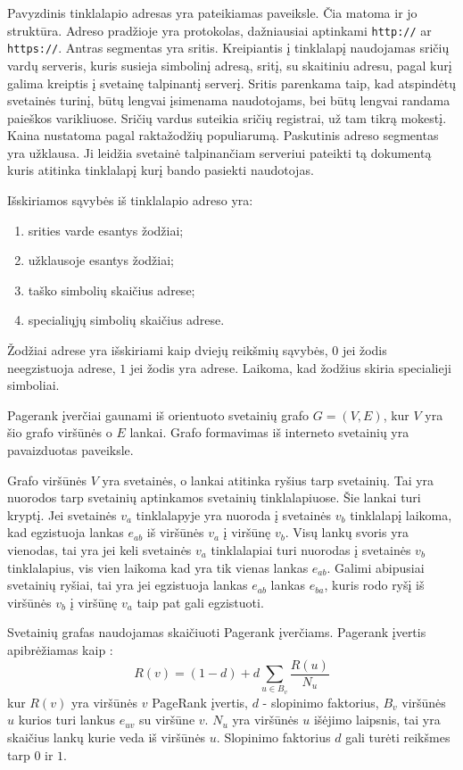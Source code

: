 Pavyzdinis tinklalapio adresas yra pateikiamas  paveiksle. Čia matoma ir jo struktūra. Adreso pradžioje yra protokolas, dažniausiai aptinkami \texttt{http://} ar \texttt{https://}. Antras segmentas yra sritis. Kreipiantis į tinklalapį naudojamas sričių vardų serveris, kuris susieja simbolinį adresą, sritį, su skaitiniu adresu, pagal kurį galima kreiptis į svetainę talpinantį serverį. Sritis parenkama taip, kad atspindėtų svetainės turinį, būtų lengvai įsimenama naudotojams, bei būtų lengvai randama paieškos varikliuose. Sričių vardus suteikia sričių registrai, už tam tikrą mokestį. Kaina nustatoma pagal raktažodžių populiarumą. Paskutinis adreso segmentas yra užklausa. Ji leidžia svetainė talpinančiam serveriui pateikti tą dokumentą kuris atitinka tinklalapį kurį bando pasiekti naudotojas.

Išskiriamos sąvybės iš tinklalapio adreso yra:
\begin{enumerate}
\item srities varde esantys žodžiai;
\item užklausoje esantys žodžiai;
\item taško simbolių skaičius adrese;
\item specialiųjų simbolių skaičius adrese.
\end{enumerate}
Žodžiai adrese yra išskiriami kaip dviejų reikšmių sąvybės, $0$ jei žodis neegzistuoja adrese, $1$ jei žodis yra adrese. Laikoma, kad žodžius skiria specialieji simboliai.

Pagerank įverčiai gaunami iš orientuoto svetainių grafo $G = (V, E)$, kur $V$ yra šio grafo viršūnės o $E$ lankai. Grafo formavimas iš interneto svetainių yra pavaizduotas  paveiksle.

Grafo viršūnės $V$ yra svetainės, o lankai atitinka ryšius tarp svetainių. Tai yra nuorodos tarp svetainių aptinkamos svetainių tinklalapiuose. Šie lankai turi kryptį. Jei svetainės $v_a$ tinklalapyje yra nuoroda į svetainės $v_b$ tinklalapį laikoma, kad egzistuoja lankas $e_{ab}$ iš viršūnės $v_a$ į viršūnę $v_b$. Visų lankų svoris yra vienodas, tai yra jei keli svetainės $v_a$ tinklalapiai turi nuorodas į svetainės $v_b$ tinklalapius, vis vien laikoma kad yra tik vienas lankas $e_{ab}$. Galimi abipusiai svetainių ryšiai, tai yra jei egzistuoja lankas $e_{ab}$ lankas $e_{ba}$, kuris rodo ryšį iš viršūnės $v_b$ į viršūnę $v_a$ taip pat gali egzistuoti.

Svetainių grafas naudojamas skaičiuoti Pagerank įverčiams. Pagerank įvertis apibrėžiamas kaip \cite{pagerank}:
\begin{equation} \label{eq:pagerank}
    R(v) = (1 - d) + d \sum_{u \in B_{v}} \frac{R(u)}{N_u}
\end{equation}
kur $R(v)$ yra viršūnės $v$ PageRank įvertis, $d$ - slopinimo faktorius, $B_v$ viršūnės $u$ kurios turi lankus $e_{uv}$ su viršūne $v$. $N_u$ yra viršūnės $u$ išėjimo laipsnis, tai yra skaičius lankų kurie veda iš viršūnės $u$. Slopinimo faktorius $d$ gali turėti reikšmes tarp $0$ ir $1$.


